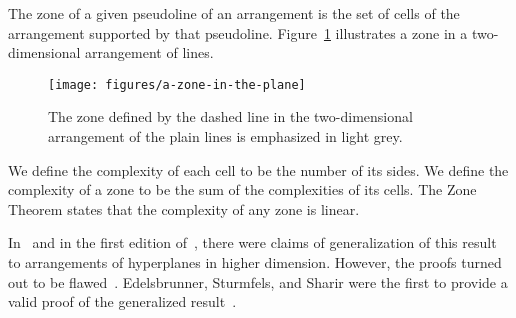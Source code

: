 
The zone of a given pseudoline of an arrangement is the set of cells of the
arrangement supported by that pseudoline.
%
Figure~\ref{fig:a-zone-in-the-plane} illustrates a zone in a two-dimensional
arrangement of lines.
%
\begin{figure}
  \centering{}
  \texttt{[image: figures/a-zone-in-the-plane]}
  \caption{%
    The zone defined by the dashed line in the two-dimensional
    arrangement of the plain lines is emphasized in light grey.%
  }\label{fig:a-zone-in-the-plane}
\end{figure}

We define the complexity of each cell to be the number of its sides.
We define the complexity of a zone to be the sum of the complexities of its cells.
%
The Zone Theorem states that the complexity of any zone is linear.
%


%

In~\cite{EOS86} and in the first edition of~\cite{Ed12}, there were claims of
generalization of this result to arrangements of hyperplanes in higher
dimension.
%
However, the proofs turned out to be flawed~\cite{ESS93}.
%
Edelsbrunner, Sturmfels, and Sharir were the first to provide a valid proof of
the generalized result~\cite{ESS93}.
%


%
%
%
%
